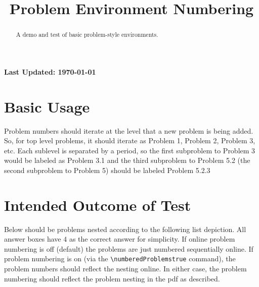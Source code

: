 \documentclass{ximera}
\title{Problem Environment Numbering}
\begin{document}
\begin{abstract}
    A demo and test of basic problem-style environments.
\end{abstract}
\maketitle


{{\Huge \bfseries Last Updated: \today}} \\

\section{Basic Usage}
Problem numbers should iterate at the level that a new problem is being added. So, for top level problems, it should iterate as
Problem 1, Problem 2, Problem 3, etc. Each sublevel is separated by a period, so the first subproblem to Problem 3 would be
labeled as Problem 3.1 and the third subproblem to Problem 5.2 (the second subproblem to Problem 5) should be labeled Problem 5.2.3

\section{Intended Outcome of Test}
Below should be problems nested according to the following list depiction. All answer boxes have $4$ as the correct answer for simplicity.
If online problem numbering is off (default) the problems are just numbered sequentially online. 
If problem numbering is on (via the \verb|\numberedProblemstrue| command), the problem numbers should reflect the nesting online.
In either case, the problem numbering should reflect the problem nesting in the pdf as described.
\end{document}
